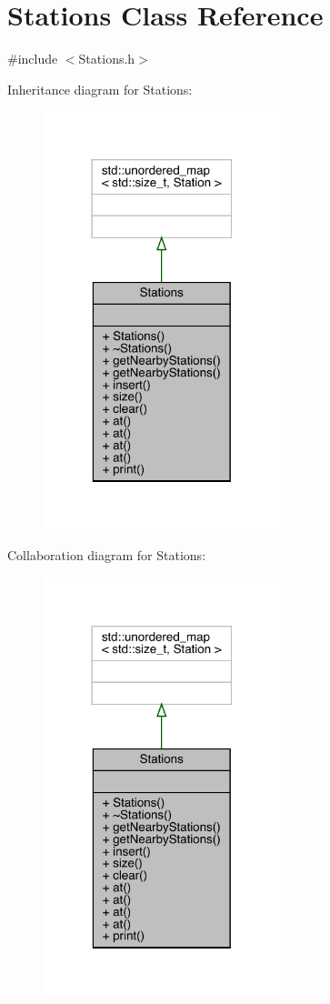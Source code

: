 \hypertarget{class_stations}{}\section{Stations Class Reference}
\label{class_stations}


{\ttfamily \#include $<$Stations.\+h$>$}



Inheritance diagram for Stations\+:
\nopagebreak
\begin{figure}[H]
\begin{center}
\leavevmode
\includegraphics[width=195pt]{class_stations__inherit__graph}
\end{center}
\end{figure}


Collaboration diagram for Stations\+:
\nopagebreak
\begin{figure}[H]
\begin{center}
\leavevmode
\includegraphics[width=195pt]{class_stations__coll__graph}
\end{center}
\end{figure}
